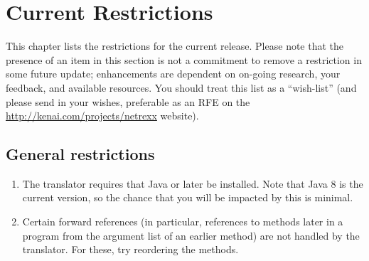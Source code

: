 \chapter{Current Restrictions}\label{restrictions}
This chapter lists the restrictions for the current release. Please note that the presence of an item in this section is not a commitment to remove a restriction in some future update; \nr{} enhancements are dependent on on-going research, your feedback, and available resources. You should treat this list as a “wish-list” (and please send in your wishes, preferable as an RFE on the \url{http://kenai.com/projects/netrexx} website). 
\section{General restrictions}
\begin{enumerate}
\item The translator requires that Java  \minimalJVMversion{} or later be installed. Note that Java 8 is the current version, so the chance that you will be impacted by this is minimal. 
\item Certain forward references (in particular, references to methods later in a program from the argument list of an earlier method) are not handled by the translator. For these, try reordering the methods.
\end{enumerate}
